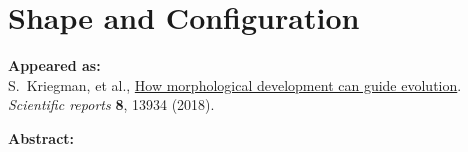 

\chapter{Shape and Configuration}

\textbf{Appeared as:}\\
S.~Kriegman, et al., \href{https://www.nature.com/articles/s41598-018-31868-7}{\color{blue}How morphological development can guide evolution}. \textit{Scientific reports} \textbf{8}, 13934 (2018).

\vspace{1em}

\noindent
\textbf{Abstract:}\\















